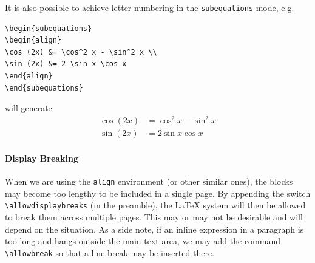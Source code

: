 It is also possible to achieve letter numbering in the \texttt{subequations} mode, e.g.\
\begin{lstlisting}
\begin{subequations}
\begin{align}
\cos (2x) &= \cos^2 x - \sin^2 x \\
\sin (2x) &= 2 \sin x \cos x
\end{align}
\end{subequations}
\end{lstlisting}
will generate
\begin{subequations}
\begin{align}
\cos (2x) &= \cos^2 x - \sin^2 x \\
\sin (2x) &= 2 \sin x \cos x
\end{align}
\end{subequations}

\paragraph{Display Breaking}
When we are using the \texttt{align} environment (or other similar ones), the blocks may become too lengthy to be included in a single page. By appending the switch \texttt{\textbackslash allowdisplaybreaks} (in the preamble), the \LaTeX{} system will then be allowed to break them across multiple pages. This may or may not be desirable and will depend on the situation. As a side note, if an inline expression in a paragraph is too long and hangs outside the main text area, we may add the command \texttt{\textbackslash allowbreak} so that a line break may be inserted there.

